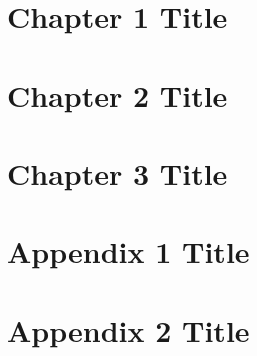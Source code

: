 \chapter*{}


\renewcommand{\abstractname}{\fontsize{18pt}{27pt}\selectfont\heiti{摘\hspace{2em}要}}
\begin{abstract}
    
\end{abstract}

\newpage

\renewcommand{\abstractname}{\fontsize{18pt}{27pt}\selectfont{Abstract}}
\begin{abstract}
    
\end{abstract}



\tableofcontents
\newpage

\chapter{Chapter 1 Title}


\chapter{Chapter 2 Title}


\chapter{Chapter 3 Title}


\appendix
\chapter{Appendix 1 Title}


\chapter{Appendix 2 Title}


\newpage




